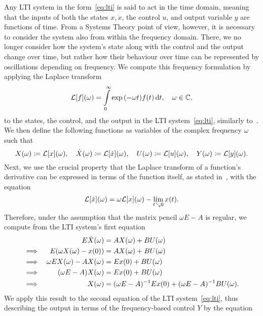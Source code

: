 Any \ac{LTI} system in the form~\eqref{eq:lti} is said to act in the time domain, meaning that the inputs of both the states $x, \dot{x}$, the control $u$, and output variable $y$ are functions of time.
From a Systems Theory point of view, however, it is necessary to consider the system also from within the frequency domain.
There, we no longer consider how the system's state along with the control and the output change over time, but rather how their behaviour over time can be represented by oscillations depending on frequency.
We compute this frequency formulation by applying the Laplace transform
\begin{equation*}
    \mathcal{L}[f](\omega) = \int\limits_0^\infty \exp{(- \omega t)} f(t) \mathop{}\!\mathrm{d} t,\quad \omega \in \mathbb{C},
\end{equation*}
to the states, the control, and the output in the \ac{LTI} system~\eqref{eq:lti}, similarly to~\cite{Arendt2011}.
We then define the following functions as variables of the complex frequency $\omega$ such that
\begin{equation*}
    X(\omega) \coloneqq \mathcal{L}[x](\omega),\quad \dot{X}(\omega) \coloneqq \mathcal{L}[\dot{x}](\omega),\quad U(\omega) \coloneqq \mathcal{L}[u](\omega),\quad Y(\omega) \coloneqq \mathcal{L}[y](\omega).
\end{equation*}
Next, we use the crucial property that the Laplace transform of a function's derivative can be expressed in terms of the function itself, as stated in~\cite[Theorem~9.1]{Doetsch1974}, with the equation
\begin{equation*}
    \mathcal{L}[\dot{x}](\omega) = \omega \mathcal{L}[x](\omega) - \lim\limits_{t \searrow 0} x(t).
\end{equation*}
Therefore, under the assumption that the matrix pencil $\omega E - A$ is regular, we compute from the \ac{LTI} system's first equation
\begin{alignat*}{3}
     & & E \dot{X}(\omega) &= A X(\omega) + B U(\omega) \\
    \implies & & E (\omega X(\omega) - x(0)) &= A X(\omega) + B U(\omega) \\
    \implies & & \omega E X(\omega) - A X(\omega) &= E x(0) + B U(\omega) \\
    \implies & & (\omega E - A) X(\omega) &= E x(0) + B U(\omega) \\
    \implies & & X(\omega) &= (\omega E - A)\inv E x(0) + (\omega E - A)\inv B U(\omega).
\end{alignat*}
We apply this result to the second equation of the \ac{LTI} system~\eqref{eq:lti}, thus describing the output in terms of the frequency-based control $Y$ by the equation
